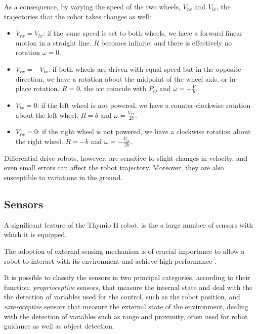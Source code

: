 \bigskip
As a consequence, by varying the speed of the two wheels, $V_{rx}$ and 
$V_{lx}$, the trajectories that the robot takes changes as well:
\begin{itemize}
	\item $V_{rx} = V_{lx}$: if the same speed is set to both wheels, we have a 
	forward linear motion in a straight line. $R$ becomes infinite, and there
	is effectively no rotation $\omega = 0$.
	 
	\item $V_{rx} = - V_{lx}$: if both wheels are driven with equal speed but in the 
	opposite direction, we have a rotation about the midpoint of the wheel axis, or 
	in-place rotation. $R=0$, the \gls{icc} coincide with $P_O$ and $\omega = - 	
	\frac{V}{b}$.
	
	\item $V_{lx} = 0$: if the left wheel is not powered, we have a  
	counter-clockwise rotation about the left wheel. $R=b$ and 
	$\omega=\frac{V_{rx}}{2b}$.
	
	\item $V_{rx} = 0$: if the right wheel is not powered, we have a clockwise 
	rotation about the right wheel. $R=-b$ and $\omega=-\frac{V_{lx}}{2b}$.
\end{itemize}

Differential drive robots, however, are sensitive to slight changes in velocity, and 
even small errors can affect the robot trajectory. Moreover, they are also 
susceptible to variations in the ground.

\subsection{Sensors}
\label{subsec:sensors}

A significant feature of the Thymio II robot, is the a large number of sensors with 
which it is equipped.

The adoption of external sensing mechanism is of crucial importance to allow a 
robot to interact with its environment and achieve high-performance 
\cite[][]{fu1987robotics, siciliano2010robotics}. 

It is possible to classify the sensors in two principal categories, according to their 
function: \emph{proprioceptive} sensors, that measure the internal state and deal 
with the the detection of variables used for the control, such as the robot position, 
and \emph{exteroceptive} sensors that measure the external state of the 
environment, dealing with the detection of variables such as range and proximity, 
often used for robot guidance as well as object detection. 

